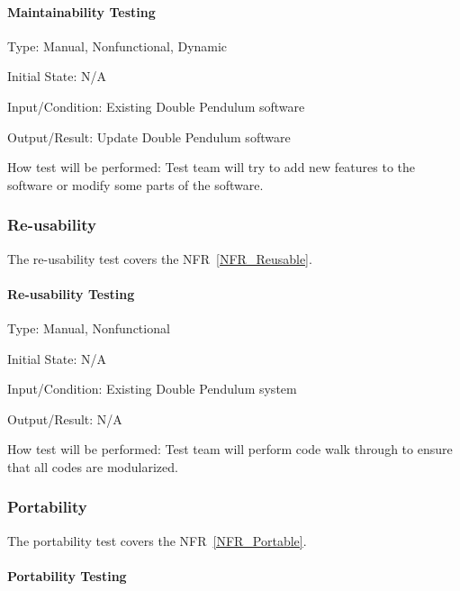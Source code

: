 \documentclass[12pt, titlepage]{article}
\begin{document}
\paragraph{Maintainability Testing\\} 

Type: Manual, Nonfunctional, Dynamic
          
Initial State: N/A
          
Input/Condition: Existing Double Pendulum software
          
Output/Result: Update Double Pendulum software
          
How test will be performed: Test team will try to add new features to the
software or modify some parts of the software.

\subsubsection{Re-usability}\label{ReuseTest}
The re-usability test covers the NFR~\ref{NFR_Reusable}. 

\paragraph{Re-usability Testing\\}
Type: Manual, Nonfunctional

Initial State: N/A
          
Input/Condition: Existing Double Pendulum system
          
Output/Result: N/A
          
How test will be performed: Test team will perform code walk through to ensure
that all codes are modularized.

\subsubsection{Portability} \label{PortTest}
The portability test covers the NFR~\ref{NFR_Portable}.

\paragraph{Portability Testing\\}
\end{document}
